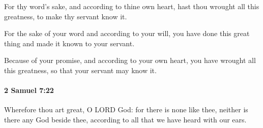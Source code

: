 			\begin{versebox}
					\item[BHS] 
					\item[ASV] For thy word's sake, and according to thine own heart, hast thou wrought all this greatness, to make thy servant know it.
					\item[NIV] For the sake of your word and according to your will, you have done this great thing and made it known to your servant.
					\item[NRSV] Because of your promise, and according to your own heart, you have wrought all this greatness, so that your servant may know it.
			\end{versebox}

		\paragraph{2 Samuel 7:22} %
			\label{2SAMUEL-7-22}

			Wherefore thou art great, O LORD God: for there is none like thee, neither is there any God beside thee, according to all that we have heard with our ears.

